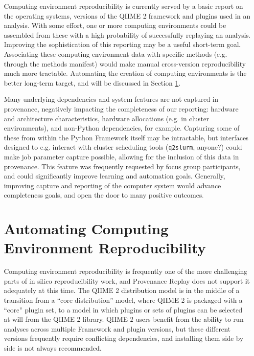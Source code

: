 Computing environment reproducibility is currently served by a basic report  on
the operating systems, versions of the QIIME 2 framework and plugins used in an
analysis. With some effort, one or more computing environments could be
assembled from these with a high probability of successfully replaying an
analysis. Improving the sophistication of this reporting may be a useful
short-term goal. Associating these computing environment data with specific
methods (e.g. through the methods manifest) would make manual cross-version
reproducibility much more tractable. Automating the creation of computing
environments is the better long-term target, and will be discussed in Section
\ref{automating_comp_env_repr}.

Many underlying dependencies and system features are not captured in provenance,
negatively impacting the completeness of our reporting: hardware and
architecture characteristics, hardware allocations (e.g. in cluster
environments), and non-Python dependencies, for example. Capturing some of these
from within the Python Framework itself may be intractable, but interfaces
designed to e.g. interact with cluster scheduling tools (\texttt{q2slurm},
anyone?) could make job parameter capture possible, allowing for the inclusion
of this data in provenance. This feature was frequently requested by focus group
participants, and could significantly improve learning and automation goals.
Generally, improving capture and reporting of the computer system would advance
completeness goals, and open the door to many positive outcomes.


\section{Automating Computing Environment Reproducibility \parencite[Issue 78]{keefe_issues_2021}}
\label{automating_comp_env_repr}

Computing environment reproducibility is frequently one of the more challenging
parts of in silico reproducibility work, and Provenance Replay does not support
it adequately at this time. The QIIME 2 distribution model is in the middle of a
transition from a “core distribution” model, where QIIME 2 is packaged with a
“core” plugin set, to a model in which plugins or sets of plugins can be
selected at will from the QIIME 2 library. QIIME 2 users benefit from the
ability to run analyses across multiple Framework and plugin versions, but these
different versions frequently require conflicting dependencies, and installing
them side by side is not always recommended.

